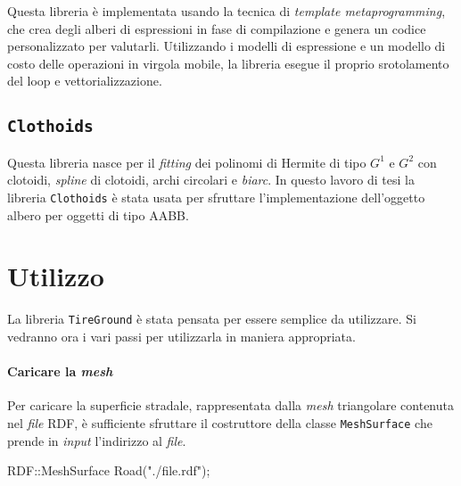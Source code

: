 Questa libreria è implementata usando la tecnica di \textit{template metaprogramming}, che crea degli alberi di espressioni in fase di compilazione e genera un codice personalizzato per valutarli. Utilizzando i modelli di espressione e un modello di costo delle operazioni in virgola mobile, la libreria esegue il proprio srotolamento del loop e vettorializzazione.
%
\subsection{\texttt{Clothoids}}
Questa libreria nasce per il \textit{fitting} dei polinomi di Hermite di tipo $G^1$ e $G^2$ con clotoidi, \textit{spline} di clotoidi, archi circolari e \textit{biarc}. In questo lavoro di tesi la libreria \texttt{Clothoids} è stata usata per sfruttare l'implementazione dell'oggetto albero per oggetti di tipo \ac{AABB}.
%
\section{Utilizzo}
La libreria \texttt{TireGround} è stata pensata per essere semplice da utilizzare. Si vedranno ora i vari passi per utilizzarla in maniera appropriata.
%
\paragraph{Caricare la \textit{mesh}}
Per caricare la superficie stradale, rappresentata dalla \textit{mesh} triangolare contenuta nel \textit{file} \ac{RDF}, è sufficiente sfruttare il costruttore della classe \texttt{MeshSurface} che prende in \textit{input} l'indirizzo al \textit{file}.
\begin{pseudoc}
	RDF::MeshSurface Road("./file.rdf");
\end{pseudoc}
%
